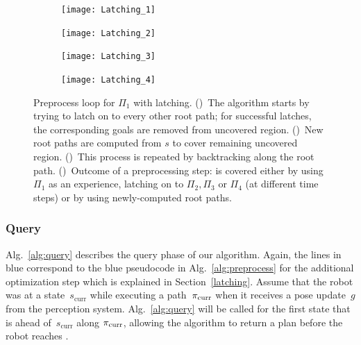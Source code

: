 \documentclass[a4paper]{report}
\begin{document}
\begin{figure}[t]
    \centering
    \begin{subfigure}{.48\textwidth}
         \texttt{[image: Latching\_1]}
        \caption{}
        \label{fig:pl1}
    \end{subfigure}
    \begin{subfigure}{.48\textwidth}
         \texttt{[image: Latching\_2]}
        \caption{}
        \label{fig:pl2}
    \end{subfigure} 
    \begin{subfigure}{.48\textwidth}
         \texttt{[image: Latching\_3]}
        \caption{}
        \label{fig:pl3}
    \end{subfigure}
    \begin{subfigure}{.48\textwidth}
         \texttt{[image: Latching\_4]}
        \caption{}
        \label{fig:pl4}
    \end{subfigure}
    \caption{\CaptionTextSize
    Preprocess loop for $\Pi_1$ with latching.
    ()~The algorithm starts by trying to latch on to every other root path; for successful latches, the corresponding goals are removed from uncovered region.
    ()~New root paths are computed from $s$ to cover remaining uncovered region.
    ()~This process is repeated by backtracking along the root path.
    ()~Outcome of a preprocessing step: \Gfull is covered either by using $\Pi_1$ as an experience, 
    latching on to $\Pi_2,\Pi_3$ or  $\Pi_4$ (at different time steps)
    or by 
    using newly-computed root paths. 
    }
    \label{fig:pl_latching}
\end{figure}

\subsubsection{Query}
Alg.~\ref{alg:query} describes the query phase of our algorithm. Again, the lines in blue correspond to the blue pseudocode in Alg.~\ref{alg:preprocess} for the additional optimization step which is explained in Section~\ref{latching}.
Assume that the robot was at a state~$s_{\textrm{curr}}$ while executing a path~$\pi_{\rm curr}$ when it receives a pose update~$g$ from the perception system. Alg.~\ref{alg:query} will be called for the first state \Sstart that is \Tbound ahead of~$s_{\textrm{curr}}$ along $\pi_{\rm curr}$, allowing the algorithm to return a plan before the robot reaches \Sstart.
\end{document}
